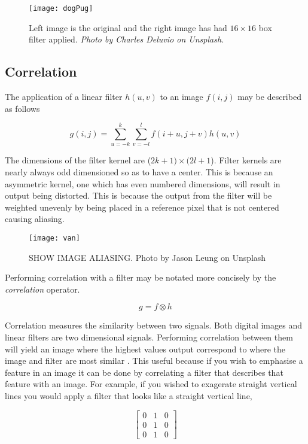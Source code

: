 \begin{figure}[H]
  \centering
  \centering\texttt{[image: dogPug]}
  \caption{Left image is the original and the right image has had $16\times16$ box filter applied. \emph{Photo by Charles Deluvio on Unsplash.}}
  \label{fig:roughDog}
\end{figure}

\subsection{Correlation}

The application of a linear filter $h(u,v)$ to an image $f(i,j)$ may be described as follows

\begin{equation} \label{eq:1}
g(i,j) = \sum_{u=-k}^{k}\sum_{v = -l}^{l}f(i+u,j+v)h(u,v)
\end{equation}


The dimensions of the filter kernel are ($2k+1) \times (2l+1$). Filter kernels are nearly always odd dimensioned so as to have a center. This is because an asymmetric kernel, one which has even numbered dimensions, will result in output being distorted. This is because the output from the filter will be weighted unevenly by being placed in a reference pixel that is not centered causing aliasing.

\begin{figure}[H]
  \centering
  \centering\texttt{[image: van]}
  \caption{SHOW IMAGE ALIASING. Photo by Jason Leung on Unsplash}
  \label{fig:van}
\end{figure}

Performing correlation with a filter may be notated more concisely by the \emph{correlation} operator.

\[g = f \otimes h\]

Correlation measures the similarity between two signals. Both digital images and linear filters are two dimensional signals. Performing correlation between them will yield an image where the highest values output correspond to where the image and filter are most similar \cite{optimalKernel}. This useful because if you wish to emphasise a feature in an image it can be done by correlating a filter that describes that feature with an image. For example, if you wished to exagerate straight vertical lines you would apply a filter that looks like a straight vertical line,

\[ 
\begin{bmatrix}
  0 & 1 & 0 \\
  0 & 1 & 0 \\
  0 & 1 & 0
\end{bmatrix}
\]


